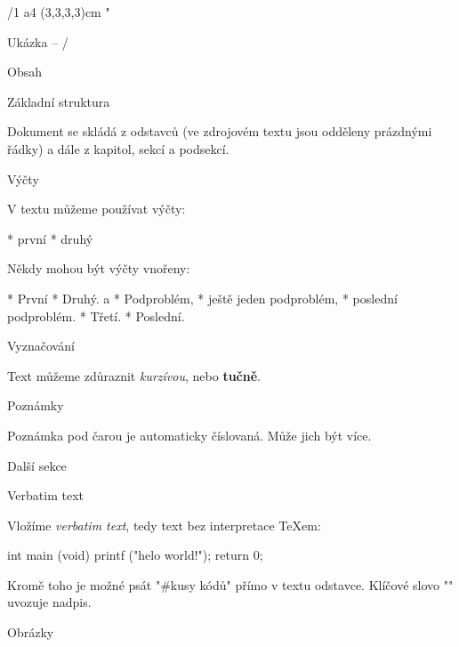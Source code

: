 

\chyph                      %
\fontfam[Schola]            %
\margins/1 a4 (3,3,3,3)cm   %
\typosize[11/13]            %
\activettchar"              %
\hyperlinks\Blue\Green      %

\def\center{\noindent\hfil} %

\tit Ukázka -- \OpTeX/

\nonum\notoc\sec Obsah

\maketoc

\sec Základní struktura

Dokument se skládá z odstavců (ve zdrojovém textu jsou odděleny prázdnými řádky)
a dále z kapitol, sekcí a podsekcí.

\secc Výčty

V textu můžeme používat výčty:

\begitems
* první
* druhý
\enditems


Někdy mohou být výčty vnořeny:

\begitems
* První
* Druhý.
  \begitems \style a
  * Podproblém,
  * ještě jeden podproblém,
  * poslední podproblém.
  \enditems
* Třetí.
* Poslední.
\enditems
 



\secc Vyznačování

Text můžeme zdůraznit {\it kurzívou}, nebo {\bf tučně}. 

\secc[poznamky]  Poznámky

Poznámka pod čarou je automaticky číslovaná.
Může jich být více.


\sec[dalsi] Další sekce

\secc Verbatim text

Vložíme {\it verbatim text}, tedy text  bez interpretace
\TeX{}em:

\begtt
int main (void) {
  printf ("helo world!\n");
  return 0;
}
\endtt

Kromě toho je možné psát "#kusy {kódů}" přímo v textu odstavce.
Klíčové slovo "\tit" uvozuje nadpis.

\secc Obrázky


